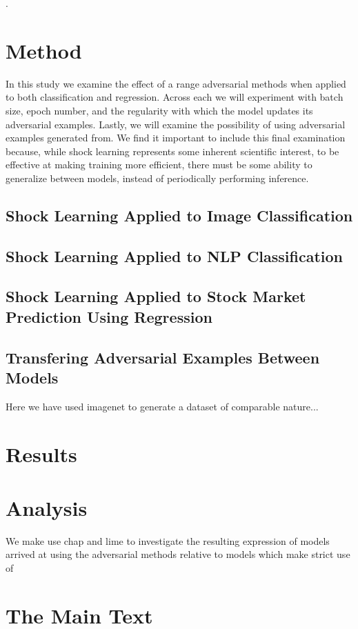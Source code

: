 \documentclass{article}
\begin{document}
\break

\cite{a-review,text-a,text-b}. 

\section{Method}
In this study we examine the effect of a range adversarial methods when applied to both classification and regression. Across each we will experiment with batch size, epoch number, and the regularity with which the model updates its adversarial examples. Lastly, we will examine the possibility of using adversarial examples generated from. We find it important to include this final examination because, while shock learning represents some inherent scientific interest, to be effective at making training more efficient, there must be some ability to generalize between models, instead of periodically performing inference.

\subsection{Shock Learning Applied to Image Classification}

\subsection{Shock Learning Applied to NLP Classification}

\subsection{Shock Learning Applied to Stock Market Prediction Using Regression}

\subsection{Transfering Adversarial Examples Between Models}
Here we have used imagenet to generate a dataset of comparable nature...

\section{Results}

\section{Analysis}
We make use chap and lime to investigate the resulting expression of models arrived at using the adversarial methods relative to models which make strict use of 

\section{The Main Text}
\label{main-text}

\begin{thebibliography}{99}


\end{thebibliography}
\end{document}
